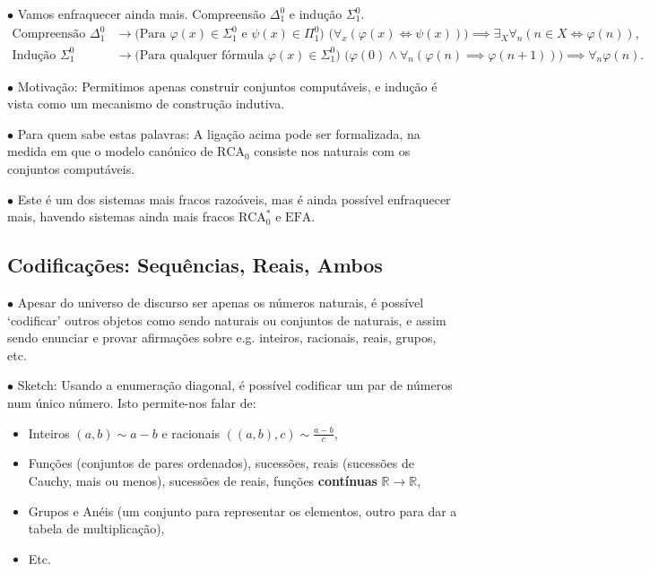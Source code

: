 \documentclass{article}
\theoremstyle{nonumberplain}
\newcommand{\R}{\mathbb{R}}
\newcommand{\EFA}{\mathrm{EFA}}
\newcommand{\RCA}{\mathrm{RCA}}
\newcommand\point[1]{\noindent \hspace{\labelsep} $\bullet$ #1 \smallskip}
\begin{document}
\point{Vamos enfraquecer ainda mais. Compreensão $\Delta^0_1$ e indução $\Sigma^0_1$.}
\begin{equation}
\begin{aligned}
\text{Compreensão $\Delta^0_1$} &\rightarrow \text{(Para $\varphi(x) \in \Sigma^0_1$ e $\psi(x) \in \Pi^0_1$) } \big(\forall_x (\varphi(x) \Leftrightarrow \psi(x)) \big) \implies \exists_X \forall_n (n \in X \iff \varphi(n)),\\
\text{Indução $\Sigma^0_1$ } &\rightarrow \text{(Para qualquer fórmula $\varphi(x) \in \Sigma^0_1$) } \big(\varphi(0) \land \forall_n (\varphi(n) \implies \varphi(n+1)) \big) \implies \forall_n \varphi(n).
\end{aligned}
\end{equation}

\point{Motivação: Permitimos apenas construir conjuntos computáveis, e indução é vista como um mecanismo de construção indutiva.}

\point{Para quem sabe estas palavras: A ligação acima pode ser formalizada, na medida em que o modelo canónico de $\RCA_0$ consiste nos naturais com os conjuntos computáveis.}

\point{Este é um dos sistemas mais fracos razoáveis, mas é ainda possível enfraquecer mais, havendo sistemas ainda mais fracos $\RCA_0^*$ e $\EFA$.}

\subsection{Codificações: Sequências, Reais, Ambos}

\point{Apesar do universo de discurso ser apenas os números naturais, é possível `codificar' outros objetos como sendo naturais ou conjuntos de naturais, e assim sendo enunciar e provar afirmações sobre e.g. inteiros, racionais, reais, grupos, etc.}

\point{Sketch: Usando a enumeração diagonal, é possível codificar um par de números num único número. Isto permite-nos falar de:

\begin{itemize}
\item Inteiros $(a,b) \sim a-b$ e racionais $((a,b),c) \sim \frac{a-b}c$,
\item Funções (conjuntos de pares ordenados), sucessões, reais (sucessões de Cauchy, mais ou menos), sucessões de reais, funções \textbf{contínuas} $\R \to \R$,
\item Grupos e Anéis (um conjunto para representar os elementos, outro para dar a tabela de multiplicação),
\item Etc.
\end{itemize}
}
\end{document}
